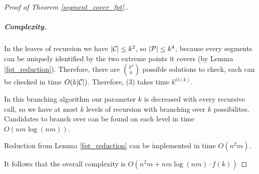 \begin{proof}[Proof of Theorem \ref{segment_cover_fpt}.]
\subparagraph{Complexity.}

In the leaves of recursion we have $|\mathcal{C}| \le k^2$, so $|\mathcal{P}| \le k^4$, because
every segments can be uniquely identified by the two extreme points it covers
(by Lemma \ref{fpt_reduction}). Therefore, there are $\binom{k^4}{k}$
possible solutions to check, each can be checked in time $O(k|\mathcal{C}|)$.
Therefore, (3) takes time $k^{O(k)}$.


In this branching algorithm our parameter $k$ is decreased with every
recursive call, so we have at most $k$ levels of recursion with
branching over $k$ possibilites. Candidates to branch over
can be found on each level in time $O(nm \log(nm))$.

Reduction from Lemma \ref{fpt_reduction} can be implemented in time $O(n^2m)$.

It follows that the overall complexity is $O(n^2m + nm \log(nm) \cdot f(k))$
\end{proof}

